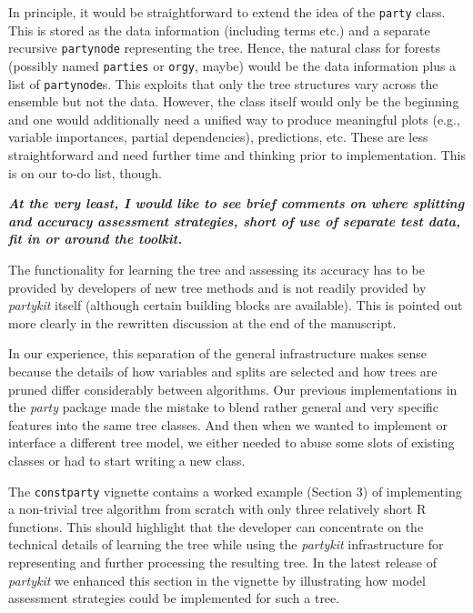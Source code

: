 \documentclass{article}
\begin{document}
\begin{enumerate}
\smallskip

In principle, it would be straightforward to extend the idea of the \texttt{party}
class. This is stored as the data information (including terms etc.) and a separate recursive
\texttt{partynode} representing the tree. Hence, the natural class for forests
(possibly named \texttt{parties} or \texttt{orgy}, maybe) would be the data
information plus a list of \texttt{partynode}s. This exploits that only the tree
structures vary across the ensemble but not the data. However, the class itself
would only be the beginning and one would additionally need a unified way to produce
meaningful plots (e.g., variable importances, partial dependencies), predictions,
etc. These are less straightforward and need further time and thinking prior
to implementation. This is on our to-do list, though.

\end{enumerate}

\textbf{\textit{%
At the very least, I would like to see brief comments on where splitting and
accuracy assessment strategies, short of use of separate test data, fit in
or around the toolkit.
}}

\smallskip

The functionality for learning the tree and assessing its accuracy has to
be provided by developers of new tree methods and is not readily provided
by \emph{partykit} itself (although certain building blocks are available).
This is pointed out more clearly in the rewritten discussion at the end of
the manuscript.

In our experience, this separation of the general infrastructure makes sense
because the details of how variables and splits are selected and how trees are
pruned differ considerably between algorithms. Our previous implementations
in the \emph{party} package made the mistake to blend rather general and very
specific features into the same tree classes. And then when we wanted to implement or
interface a different tree model, we either needed to abuse some slots of existing
classes or had to start writing a new class.

The \texttt{constparty} vignette contains a worked example (Section 3) of
implementing a non-trivial tree algorithm from scratch with only three
relatively short \textsf{R} functions. This should highlight that the
developer can concentrate on the technical details of learning
the tree while using the \emph{partykit} infrastructure for representing and
further processing the resulting tree. In the latest release of \emph{partykit}
we enhanced this section in the vignette by illustrating how model
assessment strategies could be implemented for such a tree.
\end{document}
